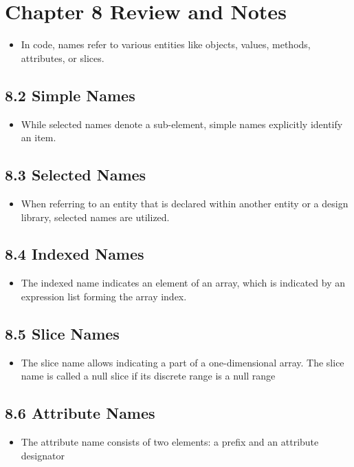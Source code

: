 \documentclass[a4paper,12pt]{article}
\begin{document}
	
	
	\section*{Chapter 8 Review and Notes}
	\begin{itemize}
		\item In code, names refer to various entities like objects, values, methods, attributes, or slices.
	\end{itemize}
	
	\subsection*{8.2 Simple Names}
	\begin{itemize}
		\item While selected names denote a sub-element, simple names explicitly identify an item.
	\end{itemize}
	
	\subsection*{8.3 Selected Names}
	\begin{itemize}
		\item When referring to an entity that is declared within another entity or a design library, selected names are utilized.
	\end{itemize}
	
	\subsection*{8.4 Indexed Names}
	\begin{itemize}
		\item The indexed name indicates an element of an array, which is indicated by an expression list forming the array index.
	\end{itemize}
	
	\subsection*{8.5 Slice Names}
	\begin{itemize}
		\item The slice name allows indicating a part of a one-dimensional array. The slice name is called a null slice if its discrete range is a null range
	\end{itemize}
	
	\subsection*{8.6 Attribute Names}
	\begin{itemize}
		\item The attribute name consists of two elements: a prefix and an attribute designator
	\end{itemize}
	
\end{document}
